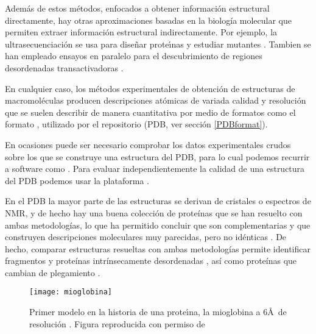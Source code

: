Adem\'{a}s de estos m\'{e}todos, enfocados a obtener informaci\'{o}n estructural directamente, hay otras aproximaciones 
basadas en la biolog\'{i}a molecular que permiten extraer informaci\'{o}n estructural indirectamente.
Por ejemplo, la ultrasecuenciaci\'{o}n se usa para dise\~{n}ar prote\'\i{}nas y estudiar mutantes \citep{Wrenbeck2017,Rocklin2017,Butterfield2017}.
Tambien se han empleado ensayos en paralelo para el descubrimiento de regiones desordenadas transactivadoras \citep{Ravarani2018}.

En cualquier caso, los m\'{e}todos experimentales de obtenci\'{o}n de estructuras de macromol\'{e}culas producen 
descripciones at\'{o}micas de variada calidad y resoluci\'{o}n que se suelen describir de manera cuantitativa 
por medio de formatos como el formato , 
utilizado por el repositorio  (PDB, ver secci\'{o}n \ref{PDBformat}).

En ocasiones puede ser necesario comprobar los datos experimentales crudos sobre los que se construye una estructura del PDB, 
para lo cual podemos recurrir a software como . 
Para evaluar independientemente la calidad de una estructura del PDB podemos usar la plataforma 
.

En el PDB la mayor parte de las estructuras se derivan de cristales o espectros de NMR, y de hecho hay
una buena colecci\'{o}n de prote\'{i}nas que se han resuelto con ambas metodolog\'{i}as, lo que ha permitido concluir 
que son complementarias y que construyen descripciones moleculares muy parecidas, pero no id\'{e}nticas \citep{Brunger1997,Sikic2010,Leman2018}.
De hecho, comparar estructuras resueltas con ambas metodolog\'{i}as permite identificar fragmentos \citep{Hrabe2016} y   
prote\'{i}nas intr\'{i}nsecamente desordenadas \citep{Ota2013}, as\'{i} como prote\'{i}nas que cambian de plegamiento \citep{Porter2018}.

\begin{figure}
\begin{center} 
\texttt{[image: mioglobina]}
\caption%
{
Primer modelo en la historia de una prote\'\i{}na, la mioglobina a 6\AA\  de resoluci\'{o}n \citep{Kendrew1958}.
Figura reproducida con permiso de 
}
\label{fig:mioglobina}
\end{center}
\end{figure}

